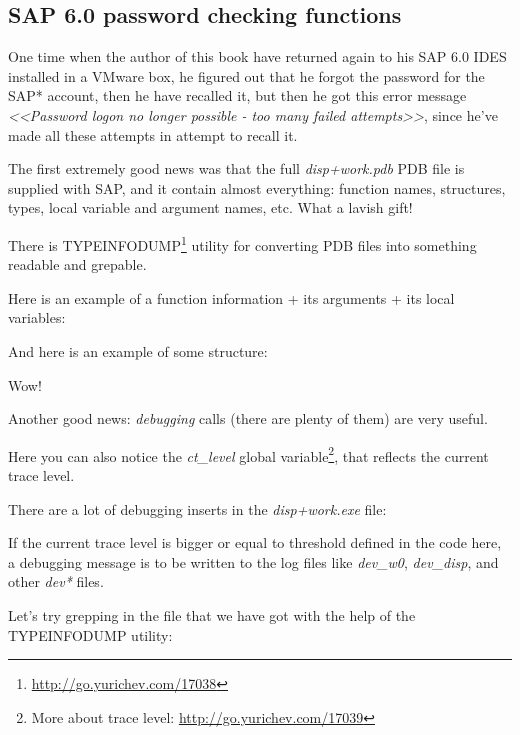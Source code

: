 \subsection{SAP 6.0 password checking functions}


One time when the author of this book have returned again to his SAP 6.0 IDES installed in a VMware box, he figured out that he forgot the password for the SAP* account, then he have recalled it, but then he got this error message 
\emph{<<Password logon no longer possible - too many failed attempts>>}, 
since he've made all these attempts in attempt to recall it.


The first extremely good news was that the full \emph{disp+work.pdb} \gls{PDB} file is supplied with SAP, and it contain almost everything: function names, structures, types, local variable and argument names, etc. What a lavish gift!

There is TYPEINFODUMP\footnote{\url{http://go.yurichev.com/17038}} utility for converting \gls{PDB} files into something readable and grepable.

Here is an example of a function information + its arguments + its local variables:



And here is an example of some structure:



Wow!

Another good news: \emph{debugging} calls (there are plenty of them) are very useful. 

Here you can also notice the \emph{ct\_level} global variable\footnote{More about trace level: \url{http://go.yurichev.com/17039}}, that reflects the current trace level.

There are a lot of debugging inserts in the \emph{disp+work.exe} file:



If the current trace level is bigger or equal to threshold defined in the code here, 
a debugging message is to be written to the log files like \emph{dev\_w0}, \emph{dev\_disp}, 
and other \emph{dev*} files.

\myindex{\GrepUsage}

Let's try grepping in the file that we have got with the help of the TYPEINFODUMP utility:

